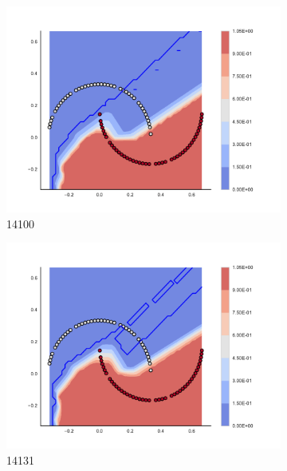 \begin{figure}[h]
\begin{subfigure}[b]{0.09\textwidth}
    \includegraphics[clip, trim=2.35cm 1.75cm 4.5cm 0cm,width=\textwidth]{img/convergence/14100.pdf}
    \caption{14100}
    \label{fig:convergence_14100}
\end{subfigure}
%
\begin{subfigure}[b]{0.09\textwidth}
    \includegraphics[clip, trim=2.35cm 1.75cm 4.5cm 0cm,width=\textwidth]{img/convergence/14131.pdf}
    \caption{14131}
    \label{fig:convergence_14131}
\end{subfigure}
%
\begin{subfigure}[b]{0.09\textwidth}

\end{subfigure}
\end{figure}
